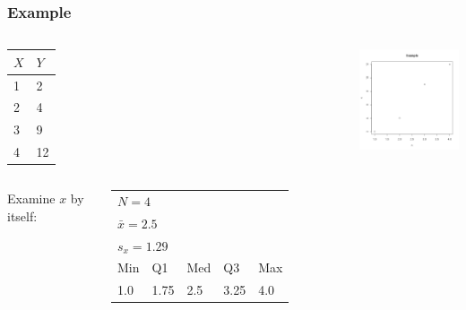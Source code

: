 \begin{frame}
\begin{columns}
{    }


  \end{columns}


\end{frame}



\begin{frame}
  \frametitle{Example}

  \begin{columns}

    \begin{tabular}{l|l}
      $X$ & $Y$ \\ \hline
      1 & 2 \\
      2 & 4  \\
      3 & 9 \\
      4 & 12
    \end{tabular}


    \vfill


    {
      \includegraphics[width=4cm]{img/simpleCorrelationExample}
    }

    \vfill

  \end{columns}


  \begin{columns}

     {

      Examine $x$ by itself: \\
      \begin{tabular}{lllll}
        \multicolumn{5}{l}{$N=4$} \\
        \multicolumn{5}{l}{$\bar{x}=2.5$} \\
        \multicolumn{5}{l}{$s_x=1.29$} \\
        Min & Q1 & Med & Q3 & Max \\
        1.0 & 1.75 & 2.5 & 3.25 & 4.0
      \end{tabular}


    }
      



\end{columns}
\end{frame}

